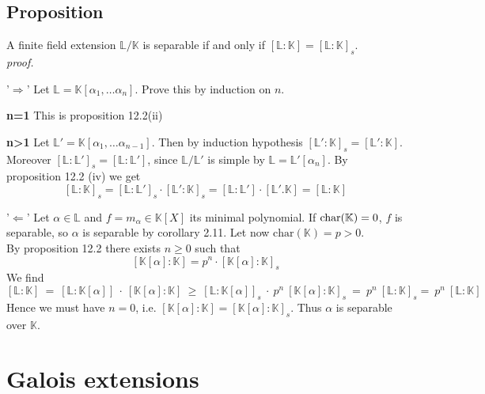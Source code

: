 \documentclass[12pt]{book}
\begin{document}
\begin{spacing}{1.3}
\subsection{Proposition}%
A finite field extension $\mathbb{L}/\mathbb{K}$ is separable if and only if $[\mathbb{L}:\mathbb{K}]=[\mathbb{L}:\mathbb{K}]_s$.
\pagebreak \\
\textit{proof.}
\begin{compactitem}
\item['$\Rightarrow$'] Let $\mathbb{L}=\mathbb{K}[\alpha_1, \dots \alpha_n]$. Prove this by induction on $n$.
\begin{compactitem}
\item[\textbf{n=1}] This is proposition 12.2(ii)
\item[\textbf{n>1}] Let $\mathbb{L}'=\mathbb{K}[\alpha_1, \dots \alpha_{n-1}]$. Then by induction hypothesis $[\mathbb{L}':\mathbb{K}]_s=[\mathbb{L}':\mathbb{K}]$. Moreover $[\mathbb{L}:\mathbb{L}']_s=[\mathbb{L}:\mathbb{L}']$, since $\mathbb{L}/\mathbb{L}'$ is simple by $\mathbb{L}=\mathbb{L}'[\alpha_n]$. By proposition 12.2 (iv) we get
$$[\mathbb{L}:\mathbb{K}]_s=[\mathbb{L}:\mathbb{L}']_s \cdot [\mathbb{L}':\mathbb{K}]_s=[\mathbb{L}:\mathbb{L}'] \cdot [\mathbb{L}'.\mathbb{K}]=[\mathbb{L}:\mathbb{K}]$$
\end{compactitem}
\item['$\Leftarrow$'] Let $\alpha \in \mathbb{L}$ and $f= m_{\alpha} \in \mathbb{K}[X]$ its minimal polynomial. If $\rm{char}(\mathbb{K})=0$, $f$ is separable, so $\alpha$ is separable by corollary 2.11. Let now $\textrm{char}(\mathbb{K})=p>0$. \\
By proposition 12.2 there exists $n \geqslant 0$ such that $$[\mathbb{K}[\alpha]:\mathbb{K}]=p^n \cdot [\mathbb{K}[\alpha]:\mathbb{K}]_s$$We find
$$
[\mathbb{L}:\mathbb{K}]\ =\ [\mathbb{L}:\mathbb{K}[\alpha]] \ \cdot\ [\mathbb{K}[\alpha]:\mathbb{K}] \ \geqslant \ [\mathbb{L}:\mathbb{K}[\alpha]]_s\ \cdot\ p^n \ [\mathbb{K}[\alpha]:\mathbb{K}]_s \ = \ p^n\ [\mathbb{L}:\mathbb{K}]_s = \ p^n  \ [\mathbb{L}:\mathbb{K}]$$
Hence we must have $n=0$, i.e. $[\mathbb{K}[\alpha]:\mathbb{K}]=[\mathbb{K}[\alpha]:\mathbb{K}]_s$. Thus $\alpha$ is separable over $\mathbb{K}$.
\end{compactitem}


\renewcommand*\thesection{\S\ \arabic{section}\quad}
\section{Galois extensions}
\renewcommand*\thesection{\arabic{section}}


\end{spacing}
\end{document}
